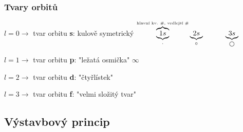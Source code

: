 \subsubsection{Tvary orbitů}
\vspace{2em}
\raggedright
\TabPositions{0em, 20em}
$l = 0 \to$ tvar orbitu \textbf{s}: kulově symetrický
\tab
$\overbrace{\underbrace{1s}_{\cdot}}^{\text{\tiny{hlavní kv. \#, vedlejší \#}}}  \underbrace{2s}_{\circ} \hspace{3em} \underbrace{3s}_{\bigcirc}$

\vspace{2em}
\raggedright
$l = 1 \to $ tvar orbitu \textbf{p}: "ležatá osmička" \tab \hspace{2em} \huge{$\infty$}

\normalsize

$l = 2 \to $ tvar orbitu \textbf{d}: "čtyřlístek"

\vspace{2em}

$l = 3 \to $ tvar orbitu \textbf{f}: "velmi složitý tvar"


\raggedright

\subsection{Výstavbový princip}
